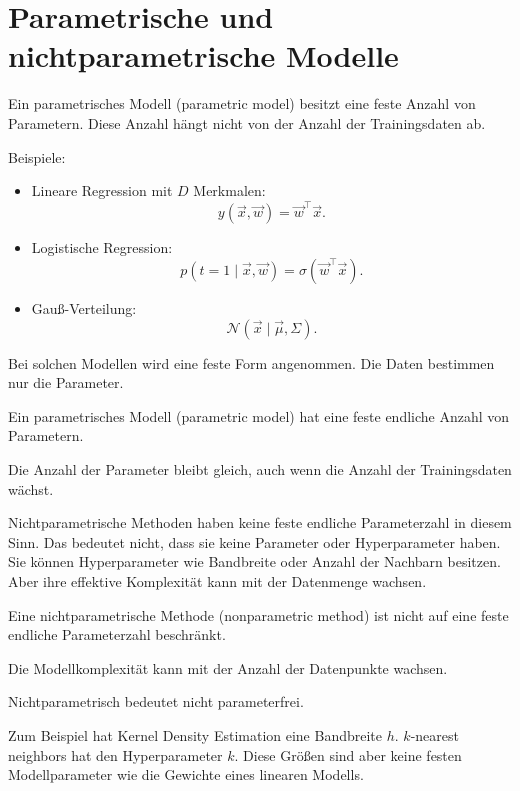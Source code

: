 \section{Parametrische und nichtparametrische Modelle}

Ein parametrisches Modell (parametric model) besitzt eine feste Anzahl von Parametern.
Diese Anzahl hängt nicht von der Anzahl der Trainingsdaten ab.

Beispiele:

\begin{itemize}
    \item Lineare Regression mit \(D\) Merkmalen:
    \[
        y(\vec{x},\vec{w})
        =
        \vec{w}^{\top}\vec{x}.
    \]

    \item Logistische Regression:
    \[
        p(t=1\mid\vec{x},\vec{w})
        =
        \sigma(\vec{w}^{\top}\vec{x}).
    \]

    \item Gauß-Verteilung:
    \[
        \mathcal{N}(\vec{x}\mid\vec{\mu},\Sigma).
    \]
\end{itemize}

Bei solchen Modellen wird eine feste Form angenommen.
Die Daten bestimmen nur die Parameter.

\begin{definitionbox}
Ein parametrisches Modell (parametric model) hat eine feste endliche Anzahl von Parametern.

Die Anzahl der Parameter bleibt gleich, auch wenn die Anzahl der Trainingsdaten wächst.
\end{definitionbox}

Nichtparametrische Methoden haben keine feste endliche Parameterzahl in diesem Sinn.
Das bedeutet nicht, dass sie keine Parameter oder Hyperparameter haben.
Sie können Hyperparameter wie Bandbreite oder Anzahl der Nachbarn besitzen.
Aber ihre effektive Komplexität kann mit der Datenmenge wachsen.

\begin{definitionbox}
Eine nichtparametrische Methode (nonparametric method) ist nicht auf eine feste endliche Parameterzahl beschränkt.

Die Modellkomplexität kann mit der Anzahl der Datenpunkte wachsen.
\end{definitionbox}

\begin{notebox}
Nichtparametrisch bedeutet nicht parameterfrei.

Zum Beispiel hat Kernel Density Estimation eine Bandbreite \(h\).
\(k\)-nearest neighbors hat den Hyperparameter \(k\).
Diese Größen sind aber keine festen Modellparameter wie die Gewichte eines linearen Modells.
\end{notebox}

